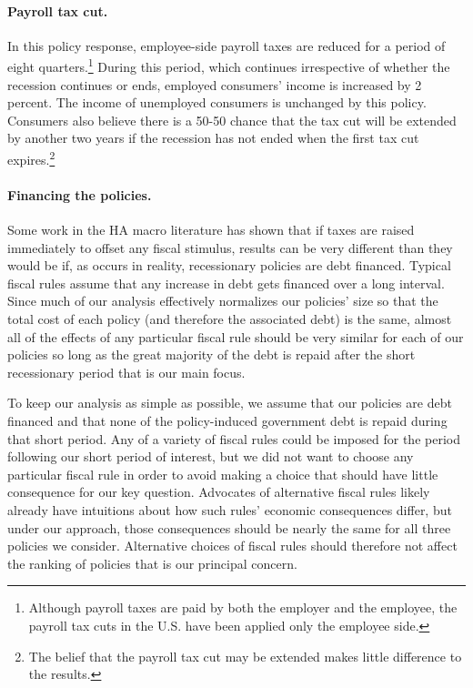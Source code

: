 \documentclass[\econtexRoot/HAFiscal]{subfiles}
\begin{document}
\paragraph{Payroll tax cut.} In this policy response, employee-side payroll taxes are reduced for a period of eight quarters.\footnote{Although payroll taxes are paid by both the employer and the employee, the payroll tax cuts in the U.S. have been applied only the employee side.} During this period, which continues irrespective of whether the recession continues or ends, employed consumers' income is increased by 2 percent. The income of unemployed consumers is unchanged by this policy. Consumers also believe there is a 50-50 chance that the tax cut will be extended by another two years if the recession has not ended when the first tax cut expires.\footnote{The belief that the payroll tax cut may be extended makes little difference to the results.}

\paragraph{Financing the policies.} Some work in the HA macro literature has shown that if taxes are raised immediately to offset any fiscal stimulus, results can be very different than they would be if, as occurs in reality, recessionary policies are debt financed.  Typical fiscal rules assume that any increase in debt gets financed over a long interval.  Since much of our analysis effectively normalizes our policies' size so that the total cost of each policy (and therefore the associated debt) is the same, almost all of the effects of any particular fiscal rule should be very similar for each of our policies so long as the great majority of the debt is repaid after the short recessionary period that is our main focus.

To keep our analysis as simple as possible, we assume that our policies are debt financed and that none of the policy-induced government debt is repaid during that short period.  Any of a variety of fiscal rules could be imposed for the period following our short period of interest, but we did not want to choose any particular fiscal rule in order to avoid making a choice that should have little consequence for our key question. Advocates of alternative fiscal rules likely already have intuitions about how such rules' economic consequences differ, but under our approach, those consequences should be nearly the same for all three policies we consider.  Alternative choices of fiscal rules should therefore not affect the ranking of policies that is our principal concern. 
\end{document}
